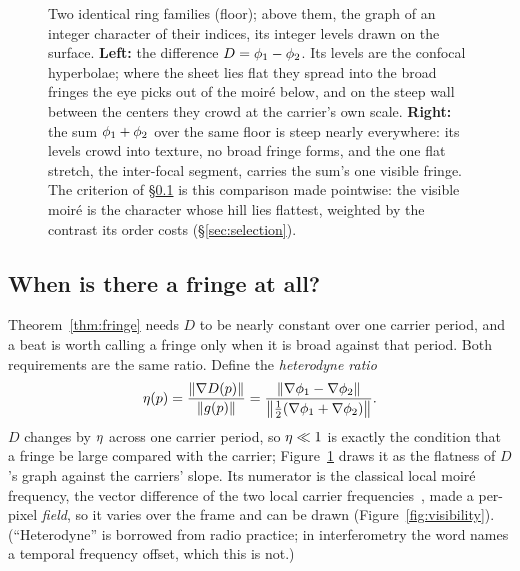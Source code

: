 \begin{figure}[t]
  \caption{
  Two identical ring families (floor); above them, the graph of an integer
  character of their indices, its integer levels drawn on the surface.
  \textbf{Left:} the difference $D=\phi_1-\phi_2$. Its levels are the
  confocal hyperbolae; where the sheet lies flat they spread into the broad
  fringes the eye picks out of the moir\'e below, and on the steep wall
  between the centers they crowd at the carrier's own scale. \textbf{Right:}
  the sum $\phi_1+\phi_2$ over the same floor is steep nearly everywhere: its
  levels crowd into texture, no broad fringe forms, and the one flat
  stretch, the inter-focal segment, carries the sum's one visible fringe.
  The criterion of \S\ref{sec:visibility} is this comparison made pointwise:
  the visible moir\'e is the character whose hill lies flattest, weighted by
  the contrast its order costs (\S\ref{sec:selection}).}
  \label{fig:hills}
\end{figure}

\subsection{When is there a fringe at all?}
\label{sec:visibility}

Theorem~\ref{thm:fringe} needs $D$ to be nearly constant over one carrier
period, and a beat is worth calling a fringe only when it is broad against that
period. Both requirements are the same ratio. Define the \emph{heterodyne ratio}
\begin{equation}
  \eta(p) = \frac{\lVert\nabla D(p)\rVert}{\lVert g(p)\rVert}
  = \frac{\lVert\nabla\phi_1-\nabla\phi_2\rVert}
         {\big\lVert\tfrac12(\nabla\phi_1+\nabla\phi_2)\big\rVert}.
  \label{eq:ratio}
\end{equation}
$D$ changes by $\eta$ across one carrier period, so $\eta\ll1$ is exactly the
condition that a fringe be large compared with the carrier;
Figure~\ref{fig:hills} draws it as the flatness of $D$'s graph against the
carriers' slope. Its numerator is the
classical local moir\'e frequency, the vector difference of the two local
carrier frequencies~\cite{Amidror2009Theory}, made a per-pixel \emph{field},
so it varies over the frame and can be drawn (Figure~\ref{fig:visibility}).
(``Heterodyne'' is borrowed from radio practice; in interferometry the word
names a temporal frequency offset, which this is not.)

